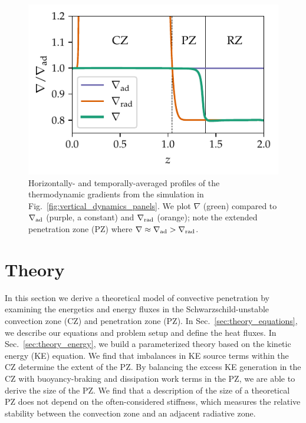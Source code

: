 \documentclass[twocolumn]{aastex631}
\newcommand{\gradrad}{\ensuremath{\nabla_{\rm{rad}}}}
\newcommand{\gradad}{\ensuremath{\nabla_{\rm{ad}}}}
\newcommand{\justgrad}{\ensuremath{\nabla}}
\begin{document}
\begin{figure}[t]
\centering
\includegraphics[width=\columnwidth]{grad_profiles.pdf}
\caption{
Horizontally- and temporally-averaged profiles of the thermodynamic gradients from the simulation in Fig.~\ref{fig:vertical_dynamics_panels}.
We plot $\justgrad$ (green) compared to $\gradad$ (purple, a constant) and $\gradrad$ (orange); note the extended penetration zone (PZ) where $\justgrad \approx \gradad > \gradrad$.
\label{fig:grad_profiles}
}
\end{figure}



\section{Theory}
\label{sec:theory}
In this section we derive a theoretical model of convective penetration by examining the energetics and energy fluxes in the Schwarzschild-unstable convection zone (CZ) and penetration zone (PZ).
In Sec.~\ref{sec:theory_equations}, we describe our equations and problem setup and define the heat fluxes.
In Sec.~\ref{sec:theory_energy}, we build a parameterized theory based on the kinetic energy (KE) equation.
We find that imbalances in KE source terms within the CZ determine the extent of the PZ.
By balancing the excess KE generation in the CZ with buoyancy-braking and dissipation work terms in the PZ, we are able to derive the size of the PZ.
We find that a description of the size of a theoretical PZ does not depend on the often-considered stiffness, which measures the relative stability between the convection zone and an adjacent radiative zone.
\end{document}
